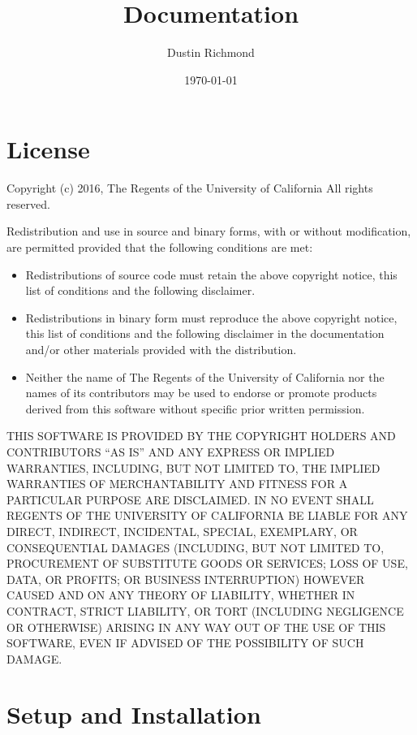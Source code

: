 \documentclass{refrep}
\title{{\TinkerVersion} Documentation}
\author{Dustin Richmond}
\date{\today}
\begin{document}
\maketitle
\pagebreak
\tableofcontents

\chapter{License}
\label{Chapter:License}

Copyright (c) 2016, The Regents of the University of California All rights
reserved.

Redistribution and use in source and binary forms, with or without modification,
are permitted provided that the following conditions are met:

\begin{itemize}
    \item Redistributions of source code must retain the above copyright
      notice, this list of conditions and the following disclaimer.

    \item Redistributions in binary form must reproduce the above
      copyright notice, this list of conditions and the following
      disclaimer in the documentation and/or other materials provided
      with the distribution.

    \item Neither the name of The Regents of the University of California
      nor the names of its contributors may be used to endorse or
      promote products derived from this software without specific
      prior written permission.
\end{itemize}

THIS SOFTWARE IS PROVIDED BY THE COPYRIGHT HOLDERS AND CONTRIBUTORS ``AS IS''
AND ANY EXPRESS OR IMPLIED WARRANTIES, INCLUDING, BUT NOT LIMITED TO, THE
IMPLIED WARRANTIES OF MERCHANTABILITY AND FITNESS FOR A PARTICULAR PURPOSE ARE
DISCLAIMED. IN NO EVENT SHALL REGENTS OF THE UNIVERSITY OF CALIFORNIA BE LIABLE
FOR ANY DIRECT, INDIRECT, INCIDENTAL, SPECIAL, EXEMPLARY, OR CONSEQUENTIAL
DAMAGES (INCLUDING, BUT NOT LIMITED TO, PROCUREMENT OF SUBSTITUTE GOODS OR
SERVICES; LOSS OF USE, DATA, OR PROFITS; OR BUSINESS INTERRUPTION) HOWEVER
CAUSED AND ON ANY THEORY OF LIABILITY, WHETHER IN CONTRACT, STRICT LIABILITY, OR
TORT (INCLUDING NEGLIGENCE OR OTHERWISE) ARISING IN ANY WAY OUT OF THE USE OF
THIS SOFTWARE, EVEN IF ADVISED OF THE POSSIBILITY OF SUCH DAMAGE.
\pagebreak

\chapter{Setup and Installation}
\label{Chapter:Setup}
\end{document}
